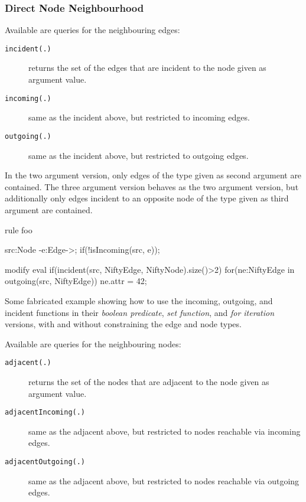 \subsubsection*{Direct Node Neighbourhood}

Available are queries for the neighbouring edges:

\begin{description}
\item[\texttt{incident(.)}] returns the set of the edges that are incident to the node given as argument value.
\item[\texttt{incoming(.)}] same as the incident above, but restricted to incoming edges.
\item[\texttt{outgoing(.)}] same as the incident above, but restricted to outgoing edges.
\end{description}

In the two argument version, only edges of the type given as second argument are contained.
The three argument version behaves as the two argument version, but additionally only edges incident to an opposite node of the type given as third argument are contained.

\begin{example}
\begin{grgen}
rule foo {
    src:Node -e:Edge->; 
    if(!isIncoming(src, e));
    
    modify {
        eval {
            if(incident(src, NiftyEdge, NiftyNode).size()>2)
            {
	              for(ne:NiftyEdge in outgoing(src, NiftyEdge))
	              {
	                  ne.attr = 42;
	              }
	          }
        }
    }
}
\end{grgen}
Some fabricated example showing how to use the incoming, outgoing, and incident functions in their \emph{boolean predicate}, \emph{set function}, and \emph{for iteration} versions, with and without constraining the edge and node types.
\end{example}

Available are queries for the neighbouring nodes:

\begin{description}
\item[\texttt{adjacent(.)}] returns the set of the nodes that are adjacent to the node given as argument value.
\item[\texttt{adjacentIncoming(.)}] same as the adjacent above, but restricted to nodes reachable via incoming edges.
\item[\texttt{adjacentOutgoing(.)}] same as the adjacent above, but restricted to nodes reachable via outgoing edges.
\end{description}


